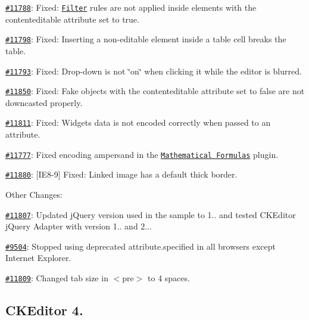 \begin{DoxyItemize}
\item \href{http://dev.ckeditor.com/ticket/11788}{\tt \#11788}\+: Fixed\+: \href{http://docs.ckeditor.com/#!/api/CKEDITOR.htmlParser.filter}{\tt Filter} rules are not applied inside elements with the {\ttfamily contenteditable} attribute set to {\ttfamily true}.
\item \href{http://dev.ckeditor.com/ticket/11798}{\tt \#11798}\+: Fixed\+: Inserting a non-\/editable element inside a table cell breaks the table.
\item \href{http://dev.ckeditor.com/ticket/11793}{\tt \#11793}\+: Fixed\+: Drop-\/down is not \char`\"{}on\char`\"{} when clicking it while the editor is blurred.
\item \href{http://dev.ckeditor.com/ticket/11850}{\tt \#11850}\+: Fixed\+: Fake objects with the {\ttfamily contenteditable} attribute set to {\ttfamily false} are not downcasted properly.
\item \href{http://dev.ckeditor.com/ticket/11811}{\tt \#11811}\+: Fixed\+: Widget\textquotesingle{}s data is not encoded correctly when passed to an attribute.
\item \href{http://dev.ckeditor.com/ticket/11777}{\tt \#11777}\+: Fixed encoding ampersand in the \href{http://ckeditor.com/addon/mathjax}{\tt Mathematical Formulas} plugin.
\item \href{http://dev.ckeditor.com/ticket/11880}{\tt \#11880}\+: \mbox{[}I\+E8-\/9\mbox{]} Fixed\+: Linked image has a default thick border.
\end{DoxyItemize}

Other Changes\+:


\begin{DoxyItemize}
\item \href{http://dev.ckeditor.com/ticket/11807}{\tt \#11807}\+: Updated j\+Query version used in the sample to 1.. and tested C\+K\+Editor j\+Query Adapter with version 1.. and 2...
\item \href{http://dev.ckeditor.com/ticket/9504}{\tt \#9504}\+: Stopped using deprecated {\ttfamily attribute.\+specified} in all browsers except Internet Explorer.
\item \href{http://dev.ckeditor.com/ticket/11809}{\tt \#11809}\+: Changed tab size in {\ttfamily $<$pre$>$} to 4 spaces.
\end{DoxyItemize}

\subsection*{C\+K\+Editor 4.}

